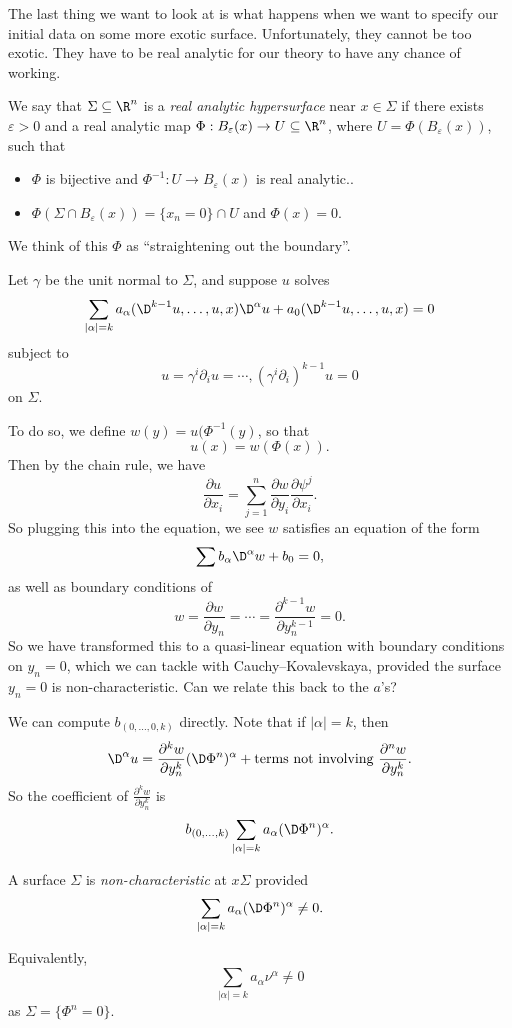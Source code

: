 \documentclass[a4paper]{article}
\begin{document}
The last thing we want to look at is what happens when we want to specify our initial data on some more exotic surface. Unfortunately, they cannot be too exotic. They have to be real analytic for our theory to have any chance of working.

\begin{defi}
  We say that $\Sigma \subseteq \R^n$ is a \emph{real analytic hypersurface} near $x \in \Sigma$ if there exists $\varepsilon > 0$ and a real analytic map $\Phi: B_\varepsilon(x) \to U \subseteq \R^n$, where $U = \Phi(B_\varepsilon(x))$, such that
  \begin{itemize}
    \item $\Phi$ is bijective and $\Phi^{-1}: U \to B_\varepsilon(x)$ is real analytic..
    \item $\Phi(\Sigma \cap B_\varepsilon(x)) = \{x_n = 0 \} \cap U$ and $\Phi(x) = 0$.
  \end{itemize}
\end{defi}
We think of this $\Phi$ as ``straightening out the boundary''.

Let $\gamma$ be the unit normal to $\Sigma$, and suppose $u$ solves
\[
  \sum_{|\alpha| = k} a_\alpha (\D^{k - 1} u, \ldots, u, x) \D^\alpha u + a_0(\D^{k - 1} u, \ldots, u, x) = 0
\]
subject to
\[
  u = \gamma^i \partial_i u = \cdots,(\gamma^i \partial_i)^{k- 1}u = 0
\]
on $\Sigma$.

To do so, we define $w(y) = u(\Phi^{-1}(y)$, so that
\[
  u(x) = w(\Phi(x)).
\]
Then by the chain rule, we have
\[
  \frac{\partial u}{\partial x_i} = \sum_{j = 1}^n \frac{\partial w}{\partial y_i} \frac{\partial \psi^j}{\partial x_i}.
\]
So plugging this into the equation, we see $w$ satisfies an equation of the form
\[
  \sum b_\alpha \D^\alpha w + b_0 = 0,
\]
as well as boundary conditions of
\[
  w = \frac{\partial w}{\partial y_n} = \cdots = \frac{\partial^{k - 1}w }{\partial y_n^{k - 1}} = 0.
\]
So we have transformed this to a quasi-linear equation with boundary conditions on $y_n = 0$, which we can tackle with Cauchy--Kovalevskaya, provided the surface $y_n = 0$ is non-characteristic. Can we relate this back to the $a$'s?

We can compute $b_{(0, \ldots, 0, k)}$ directly. Note that if $|\alpha| = k$, then
\[
  \D^\alpha u = \frac{\partial^k w}{\partial y_n^k} (\D \Phi^n)^\alpha + \text{terms not involving $\frac{\partial^n w}{\partial y_n^k}$}.
\]
So the coefficient of $\frac{\partial^k w}{\partial y_n^k}$ is
\[
  b_{(0, \ldots, k)} \sum_{|\alpha| = k} a_\alpha( \D \Phi^n)^\alpha.
\]
\begin{defi}
  A surface $\Sigma$ is \emph{non-characteristic} at $x \Sigma$ provided
  \[
    \sum_{|\alpha| = k} a_\alpha (\D \Phi^n)^\alpha \not= 0.
  \]
\end{defi}
Equivalently,
\[
  \sum_{|\alpha| = k} a_\alpha \nu^\alpha \not= 0 %
\]
as $\Sigma = \{\Phi^n = 0\}$.
\end{document}

